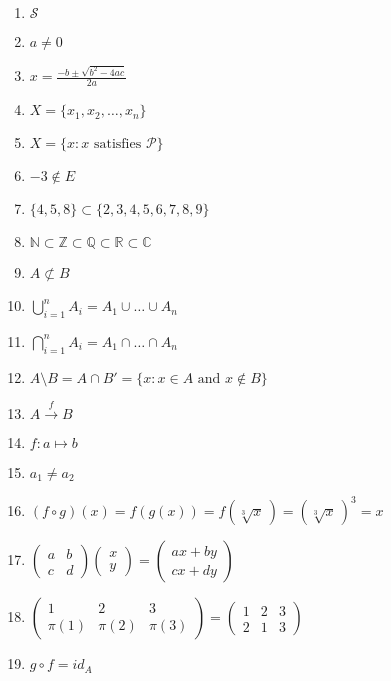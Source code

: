 \documentclass[oneside,10pt,]{article}
\title{}
\date{}
\newcommand{\notsubset}{\not\subset}
\begin{document}
\hypertarget{g:article:idp1}{}
%
\begin{enumerate}
\item{}\(\mathcal S\)%
\item{}\(a \neq 0\)%
\item{}\(x = \frac{-b \pm \sqrt{b^2 - 4ac}}{2a}\)%
\item{}\(X = \{ x_1, x_2, \ldots, x_n \}\)%
\item{}\(X = \{ x :x \text{ satisfies }{\mathcal P}\}\)%
\item{}\(-3 \notin E\)%
\item{}\(\{4,5,8\} \subset \{2, 3, 4, 5, 6, 7, 8, 9 \}\)%
\item{}\({\mathbb N} \subset {\mathbb Z} \subset {\mathbb Q} \subset {\mathbb R} \subset {\mathbb C}\)%
\item{}\(A \notsubset B\)%
\item{}\(\bigcup_{i = 1}^{n} A_{i} = A_{1} \cup \ldots \cup A_n\)%
\item{}\(\bigcap_{i = 1}^{n} A_{i} = A_{1} \cap \ldots \cap A_n\)%
\item{}\(A \setminus B = A \cap B' = \{ x : x \in A \text{ and } x \notin B \}\)%
\item{}\(A \stackrel{f}{\rightarrow} B\)%
\item{}\(f : a \mapsto b\)%
\item{}\(a_1 \neq a_2\)%
\item{}\((f \circ g )(x) = f(g(x)) = f( \sqrt[3]{x}\, ) = (\sqrt[3]{x}\, )^3 = x\)%
\item{}\(\begin{pmatrix} a & b \\ c & d \end{pmatrix} \begin{pmatrix} x \\ y \end{pmatrix} = \begin{pmatrix} ax + by \\ cx +dy \end{pmatrix}\)%
\item{}\(\begin{pmatrix} 1 & 2 & 3 \\ \pi(1) & \pi(2) & \pi(3) \end{pmatrix} = \begin{pmatrix} 1 & 2 & 3 \\ 2 & 1 & 3 \end{pmatrix}\)%
\item{}\(g \circ f = id_A\)%

\end{enumerate}
\end{document}
